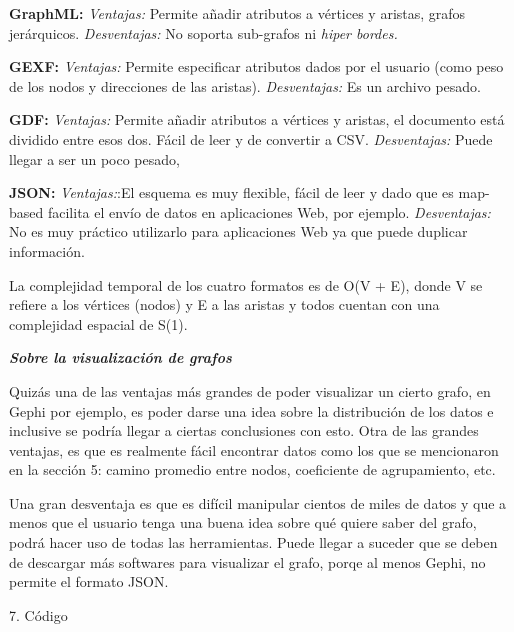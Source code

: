 \documentclass[12pt, letterpaper, twocolumn]{article}
\begin{document}
\textbf{GraphML:} \textit{Ventajas:} Permite añadir atributos a vértices y aristas, grafos jerárquicos. \textit{Desventajas:}  No soporta sub-grafos ni \textit{hiper bordes.}

\textbf{GEXF:} \textit{Ventajas:} Permite especificar atributos dados por el usuario (como peso de los nodos y direcciones de las aristas). \textit{Desventajas:}  Es un archivo pesado.

\textbf{GDF:} \textit{Ventajas:} Permite añadir atributos a vértices y aristas, el documento está dividido entre esos dos. Fácil de leer y de convertir a CSV. \textit{Desventajas:}  Puede llegar a ser un poco pesado,

\textbf{JSON:} \textit{Ventajas:}:El esquema es muy flexible, fácil de leer y dado que es map-based facilita el envío de datos en aplicaciones Web, por ejemplo. \textit{Desventajas:} No es muy práctico utilizarlo para aplicaciones Web ya que puede duplicar información. 

La complejidad temporal de los cuatro formatos es de O(V + E), donde V se refiere a los vértices (nodos) y E a las aristas y todos cuentan con una complejidad espacial de S(1).
\break

\textbf{\emph{Sobre la visualización de grafos}}

Quizás una de las ventajas más grandes de poder visualizar un cierto grafo, en Gephi por ejemplo, es poder darse una idea sobre la distribución de los datos e inclusive se podría llegar a ciertas conclusiones con esto. Otra de las grandes ventajas, es que es realmente fácil encontrar datos como los que se mencionaron en la sección 5: camino promedio entre nodos, coeficiente de agrupamiento, etc. 

Una gran desventaja es que es difícil manipular cientos de miles de datos y que a menos que el usuario tenga una buena idea sobre qué quiere saber del grafo, podrá hacer uso de todas las herramientas. Puede llegar a suceder que se deben de descargar más softwares para visualizar el grafo, porqe al menos Gephi, no permite el formato JSON.


\begin{description}
\item[{7. Código}]~
\end{description}
\end{document}

